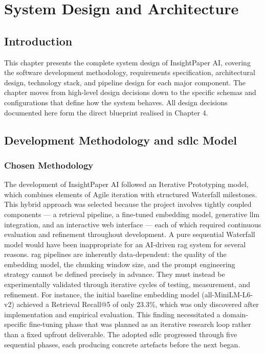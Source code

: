 \chapter{System Design and Architecture}

\section{Introduction}

This chapter presents the complete system design of InsightPaper AI, covering the software development methodology, requirements specification, architectural design, technology stack, and pipeline design for each major component. The chapter moves from high-level design decisions down to the specific schemas and configurations that define how the system behaves. All design decisions documented here form the direct blueprint realised in Chapter 4.

\section{Development Methodology and \gls{sdlc} Model}

\subsection{Chosen Methodology}

The development of InsightPaper AI followed an Iterative Prototyping model, which combines elements of Agile iteration with structured Waterfall milestones. This hybrid approach was selected because the project involves tightly coupled components — a retrieval pipeline, a fine-tuned embedding model, generative \gls{llm} integration, and an interactive web interface — each of which required continuous evaluation and refinement throughout development.
\newline \newline A pure sequential Waterfall model would have been inappropriate for an AI-driven \gls{rag} system for several reasons. \gls{rag} pipelines are inherently data-dependent: the quality of the embedding model, the chunking window size, and the prompt engineering strategy cannot be defined precisely in advance. They must instead be experimentally validated through iterative cycles of testing, measurement, and refinement. For instance, the initial baseline embedding model (all-MiniLM-L6-v2) achieved a Retrieval Recall@5 of only 23.3\%, which was only discovered after implementation and empirical evaluation. This finding necessitated a domain-specific fine-tuning phase that was planned as an iterative research loop rather than a fixed upfront deliverable.
\newline \newline The adopted \gls{sdlc} progressed through five sequential phases, each producing concrete artefacts before the next began.

